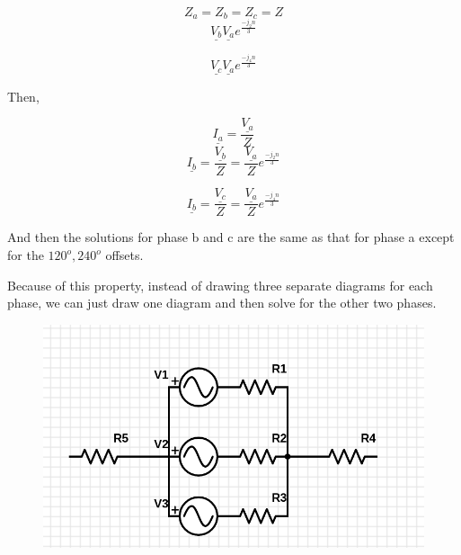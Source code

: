 \documentclass[10pt]{article}
\begin{document}
\begin{example}
	\begin{equation}
		Z_a = Z_b = Z_c = Z
	\end{equation}
	\begin{equation}
		\underline{V_b}
		\underline{V_a} e^{\frac{-j_2n}{3}}
	\end{equation}

	\begin{equation}
		\underline{V_c}
		\underline{V_a} e^{\frac{-j_4n}{3}}
	\end{equation}

	Then,

	\begin{equation}
		\underline{I_a} = \frac{\underline{V_a}}{Z}
	\end{equation}
	\begin{equation}
		\underline{I_b} = \frac{\underline{V_b}}{Z} = \frac{\underline{V_a}}{Z} e^{\frac{-j_2n}{3}}
	\end{equation}

	\begin{equation}
		\underline{I_b} = \frac{\underline{V_c}}{Z} = \frac{\underline{V_a}}{Z} e^{\frac{-j_4n}{3}}
	\end{equation}

	And then the solutions for phase b and c are the same as that for phase a except for the $ 120^o, 240^o$  offsets.
	
\end{example}


Because of this property, instead of drawing three separate diagrams for each phase, we can just draw one diagram and then solve for the other two phases.
\begin{figure}[H]
	\centering
	\includegraphics[width=0.8\linewidth]{img/image_2022-09-18-02-32-50.png}
\end{figure}
\end{document}
